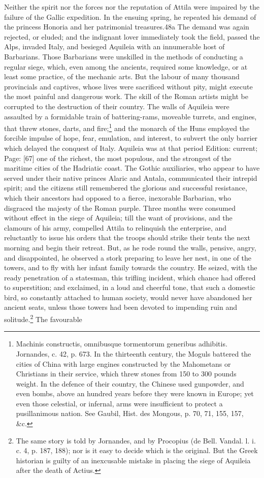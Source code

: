 Neither the spirit nor the forces nor the reputation of Attila were impaired by the failure of the Gallic expedition. In the ensuing spring, he repeated his demand of the princess Honoria and her patrimonial treasures.48a The demand was again rejected, or eluded; and the indignant lover immediately took the field, passed the Alps, invaded Italy, and besieged Aquileia with an innumerable host of Barbarians. Those Barbarians were unskilled in the methods of conducting a regular siege, which, even among the ancients, required some knowledge, or at least some practice, of the mechanic arts. But the labour of many thousand provincials and captives, whose lives were sacrificed without pity, might execute the most painful and dangerous work. The skill of the Roman artists might be corrupted to the destruction of their country. The walls of Aquileia were assaulted by a formidable train of battering-rams, moveable turrets, and engines, that threw stones, darts, and fire;\footnote{Machinis constructis, omnibusque tormentorum generibus adhibitis. Jornandes, c. 42, p. 673. In the thirteenth century, the Moguls battered the cities of China with large engines constructed by the Mahometans or Christians in their service, which threw stones from 150 to 300 pounds weight. In the defence of their country, the Chinese used gunpowder, and even bombs, above an hundred years before they were known in Europe; yet even those celestial, or infernal, arms were insufficient to protect a pusillanimous nation. See Gaubil, Hist. des Mongous, p. 70, 71, 155, 157, \&c.} and the monarch of the Huns employed the forcible impulse of hope, fear, emulation, and interest, to subvert the only barrier which delayed the conquest of Italy. Aquileia was at that period Edition: current; Page: [67] one of the richest, the most populous, and the strongest of the maritime cities of the Hadriatic coast. The Gothic auxiliaries, who appear to have served under their native princes Alaric and Antala, communicated their intrepid spirit; and the citizens still remembered the glorious and successful resistance, which their ancestors had opposed to a fierce, inexorable Barbarian, who disgraced the majesty of the Roman purple. Three months were consumed without effect in the siege of Aquileia; till the want of provisions, and the clamours of his army, compelled Attila to relinquish the enterprise, and reluctantly to issue his orders that the troops should strike their tents the next morning and begin their retreat. But, as he rode round the walls, pensive, angry, and disappointed, he observed a stork preparing to leave her nest, in one of the towers, and to fly with her infant family towards the country. He seized, with the ready penetration of a statesman, this trifling incident, which chance had offered to superstition; and exclaimed, in a loud and cheerful tone, that such a domestic bird, so constantly attached to human society, would never have abandoned her ancient seats, unless those towers had been devoted to impending ruin and solitude.\footnote{The same story is told by Jornandes, and by Procopius (de Bell. Vandal. l. i. c. 4, p. 187, 188); nor is it easy to decide which is the original. But the Greek historian is guilty of an inexcusable mistake in placing the siege of Aquileia after the death of Actius.} The favourable 